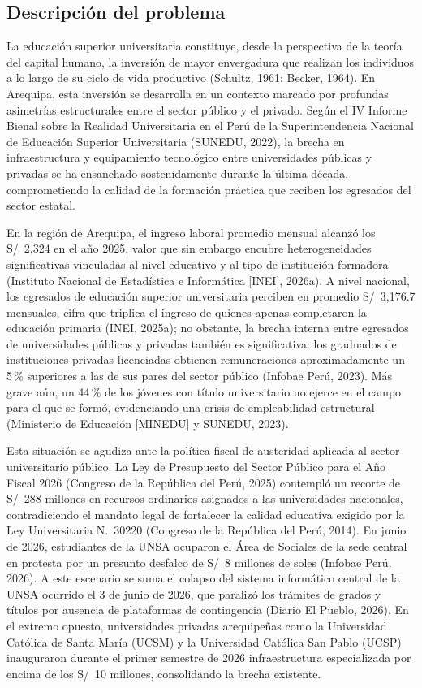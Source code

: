 \documentclass[11pt, a4paper]{article}
\begin{document}
\subsection{Descripción del problema}

La educación superior universitaria constituye, desde la perspectiva de la teoría del capital humano, la inversión de mayor envergadura que realizan los individuos a lo largo de su ciclo de vida productivo (Schultz, 1961; Becker, 1964). En Arequipa, esta inversión se desarrolla en un contexto marcado por profundas asimetrías estructurales entre el sector público y el privado. Según el IV Informe Bienal sobre la Realidad Universitaria en el Perú de la Superintendencia Nacional de Educación Superior Universitaria (SUNEDU, 2022), la brecha en infraestructura y equipamiento tecnológico entre universidades públicas y privadas se ha ensanchado sostenidamente durante la última década, comprometiendo la calidad de la formación práctica que reciben los egresados del sector estatal.

En la región de Arequipa, el ingreso laboral promedio mensual alcanzó los S/~2{,}324 en el año 2025, valor que sin embargo encubre heterogeneidades significativas vinculadas al nivel educativo y al tipo de institución formadora (Instituto Nacional de Estadística e Informática [INEI], 2026a). A nivel nacional, los egresados de educación superior universitaria perciben en promedio S/~3{,}176.7 mensuales, cifra que triplica el ingreso de quienes apenas completaron la educación primaria (INEI, 2025a); no obstante, la brecha interna entre egresados de universidades públicas y privadas también es significativa: los graduados de instituciones privadas licenciadas obtienen remuneraciones aproximadamente un 5\,\% superiores a las de sus pares del sector público (Infobae Perú, 2023). Más grave aún, un 44\,\% de los jóvenes con título universitario no ejerce en el campo para el que se formó, evidenciando una crisis de empleabilidad estructural (Ministerio de Educación [MINEDU] y SUNEDU, 2023).

Esta situación se agudiza ante la política fiscal de austeridad aplicada al sector universitario público. La Ley de Presupuesto del Sector Público para el Año Fiscal 2026 (Congreso de la República del Perú, 2025) contempló un recorte de S/~288 millones en recursos ordinarios asignados a las universidades nacionales, contradiciendo el mandato legal de fortalecer la calidad educativa exigido por la Ley Universitaria N.\textdegree~30220 (Congreso de la República del Perú, 2014). En junio de 2026, estudiantes de la UNSA ocuparon el Área de Sociales de la sede central en protesta por un presunto desfalco de S/~8 millones de soles (Infobae Perú, 2026). A este escenario se suma el colapso del sistema informático central de la UNSA ocurrido el 3 de junio de 2026, que paralizó los trámites de grados y títulos por ausencia de plataformas de contingencia (Diario El Pueblo, 2026). En el extremo opuesto, universidades privadas arequipeñas como la Universidad Católica de Santa María (UCSM) y la Universidad Católica San Pablo (UCSP) inauguraron durante el primer semestre de 2026 infraestructura especializada por encima de los S/~10 millones, consolidando la brecha existente.
\end{document}
